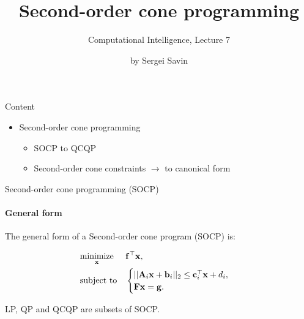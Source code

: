 \documentclass{beamer}
\title{Second-order cone programming}
\subtitle{Computational Intelligence, Lecture 7}
\author{by Sergei Savin}
\date{\mydate}
\begin{document}
\maketitle


\begin{frame}{Content}

\begin{itemize}
\item  Second-order cone programming
	\begin{itemize}
		\item  SOCP to QCQP
		\item  Second-order cone constraints $\rightarrow$ to canonical form
	\end{itemize}
\end{itemize}

\end{frame}






\begin{frame}{Second-order cone programming (SOCP)}
\framesubtitle{General form}
\begin{flushleft}


The general form of a Second-order cone program (SOCP) is:

%
\begin{equation}
\begin{aligned}
& \underset{\mathbf{x}}{\text{minimize}}
& & \mathbf{f}^\top\mathbf{x}, \\
& \text{subject to}
& & \begin{cases}
    ||\mathbf{A}_i\mathbf{x} + \mathbf{b}_i||_2 \leq 
     \mathbf{c}_i^\top \mathbf{x} + d_i, \\
    \mathbf{F}\mathbf{x} = \mathbf{g}.
    \end{cases}
\end{aligned}
\end{equation}

LP, QP and QCQP are subsets of SOCP.
 
\end{flushleft}
\end{frame}
\end{document}
